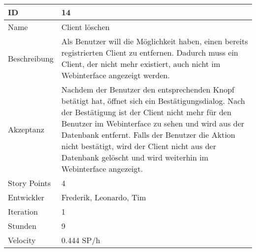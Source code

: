 \begin{table}[htbp]
    \begin{minipage}{\linewidth}
        \setlength{\tymax}{0.5\linewidth}
        \centering
        \small
        \begin{tabulary}{\textwidth}{|l|p{10cm}|} \hline
            ID   &14\\\hline
            Name  &Client löschen\\\hline
            Beschreibung&Als Benutzer will die Möglichkeit haben, einen bereits registrierten Client zu entfernen. Dadurch muss ein Client, der nicht mehr existiert, auch nicht im Webinterface angezeigt werden.\\\hline
            Akzeptanz &Nachdem der Benutzer den entsprechenden Knopf betätigt hat, öffnet sich ein Bestätigungsdialog. Nach der Bestätigung ist der Client nicht mehr für den Benutzer im Webinterface zu sehen und wird aus der Datenbank entfernt. Falls der Benutzer die Aktion nicht bestätigt, wird der Client nicht aus der Datenbank gelöscht und wird weiterhin im Webinterface angezeigt.\\\hline
            Story Points&4\\\hline
            Entwickler &Frederik, Leonardo, Tim\\\hline
            Iteration &1\\\hline
            Stunden  &9\\\hline
            Velocity &0.444 SP\slash h\\\hline
        \end{tabulary}
    \end{minipage}
\end{table}



